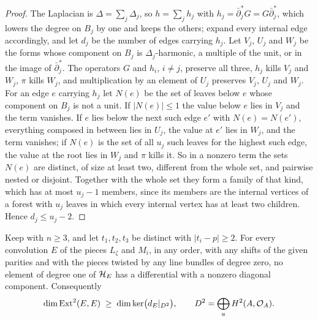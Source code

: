 \begin{proof}
The Laplacian is $\Delta=\sum_{j}\Delta_{j}$, so $h=\sum_{j}h_{j}$ with
$h_{j}=\bar\partial_{j}^{*}G=G\bar\partial_{j}^{*}$, which lowers the degree
on $B_{j}$ by one and keeps the others; expand every internal edge
accordingly, and let $d_{j}$ be the number of edges carrying $h_{j}$. Let
$V_{j}$, $U_{j}$ and $W_{j}$ be the forms whose component on $B_{j}$ is
$\Delta_{j}$-harmonic, a multiple of the unit, or in the image of
$\bar\partial_{j}^{*}$. The operators $G$ and $h_{i}$, $i\ne j$, preserve all
three, $h_{j}$ kills $V_{j}$ and $W_{j}$, $\pi$ kills $W_{j}$, and
multiplication by an element of $U_{j}$ preserves $V_{j}$, $U_{j}$ and
$W_{j}$. For an edge $e$ carrying $h_{j}$ let $N(e)$ be the set of leaves
below $e$ whose component on $B_{j}$ is not a unit. If $|N(e)|\le1$ the
value below $e$ lies in $V_{j}$ and the term vanishes. If $e$ lies below the
next such edge $e'$ with $N(e)=N(e')$, everything composed in between lies
in $U_{j}$, the value at $e'$ lies in $W_{j}$, and the term vanishes; if
$N(e)$ is the set of all $u_{j}$ such leaves for the highest such edge, the
value at the root lies in $W_{j}$ and $\pi$ kills it. So in a nonzero term
the sets $N(e)$ are distinct, of size at least two, different from the whole
set, and pairwise nested or disjoint. Together with the whole set they form
a family of that kind, which has at most $u_{j}-1$ members, since its members
are the internal vertices of a forest with $u_{j}$ leaves in which every
internal vertex has at least two children. Hence $d_{j}\le u_{j}-2$.
\end{proof}

\begin{proposition}\label{prop:nothingenters}
Keep  with $n\ge3$, and let $t_{1},t_{2},t_{3}$ be
distinct with $|t_{i}-p|\ge2$. For every convolution $E$ of the pieces
$L_{\zeta}$ and $M_{i}$, in any order, with any shifts of the given parities
and with the pieces twisted by any line bundles of degree zero, no element of
degree one of $\mathcal{H}_{E}$ has a differential with a nonzero diagonal
component. Consequently
\[
  \dim\operatorname{Ext}^{2}(E,E)\;\ge\;\dim\ker\bigl(d_{E}|_{D^{2}}\bigr),
  \qquad
  D^{2}=\bigoplus_{a}H^{2}(A,\mathcal{O}_{A}).
\]
\end{proposition}

